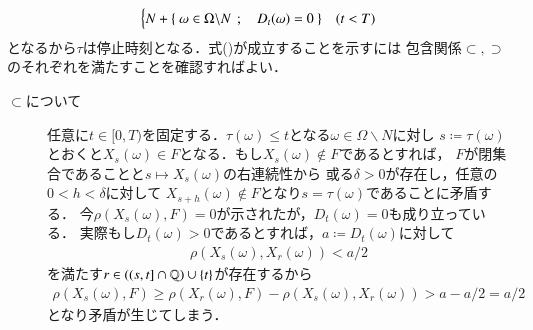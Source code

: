 \begin{prf}
\begin{align}
\begin{cases}
				N + \left\{\ \omega \in \Omega \backslash N\ \, ; \quad D_t(\omega) = 0\ \right\} & (t < T)
 			\end{cases}
		\end{align}
		となるから$\tau$は停止時刻となる．式()が成立することを示すには
		包含関係$\subset,\supset$のそれぞれを満たすことを確認すればよい．
		\begin{description}
			\item[$\subset$について]
				任意に$t \in [0,T)$を固定する．$\tau(\omega) \leq t$となる$\omega \in \Omega \backslash N$に対し
				$s \coloneqq \tau(\omega)$とおくと$X_s(\omega) \in F$となる．もし$X_s(\omega) \notin F$であるとすれば，
				$F$が閉集合であることと$s \longmapsto X_s(\omega)$の右連続性から
				或る$\delta > 0$が存在し，任意の$0 < h < \delta$に対して
				$X_{s+h}(\omega) \notin F$となり$s = \tau(\omega)$であることに矛盾する．
				今$\rho(X_s(\omega),F) = 0$が示されたが，$D_t(\omega) = 0$も成り立っている．
				実際もし$D_t(\omega) > 0$であるとすれば，$a \coloneqq D_t(\omega)$に対して
				\begin{align}
					\rho(X_s(\omega), X_r(\omega)) < a/2
				\end{align}
				を満たす$r \in ((s,t] \cap \mathbb{Q}) \cup \{t\}$が存在するから
				\begin{align}
					\rho(X_s(\omega),F) \geq \rho(X_r(\omega),F) - \rho(X_s(\omega), X_r(\omega)) > a - a/2 = a/2
				\end{align}
				となり矛盾が生じてしまう．
			

\end{description}
\end{prf}
